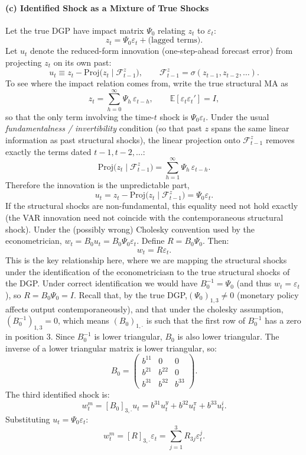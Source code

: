 \documentclass[12pt]{article}
\newcommand{\E}{\mathbb E}
\theoremstyle{definition}
\begin{document}
\bigskip
\paragraph{(c) Identified Shock as a Mixture of True Shocks}
Let the true DGP have impact matrix $\Psi_0$ relating $z_t$ to $\varepsilon_t$:
\[
z_t = \Psi_0 \varepsilon_t + \text{(lagged terms)}.
\]
\noindent Let $u_t$ denote the reduced-form innovation (one-step-ahead forecast error) from projecting $z_t$ on its own past:
\[
u_t \equiv z_t-\mathrm{Proj}\big(z_t\mid\mathcal F^{z}_{t-1}\big), \qquad \mathcal F^{z}_{t-1}=\sigma(z_{t-1},z_{t-2},\ldots).
\]
To see where the impact relation comes from, write the true structural MA as
\[
z_t=\sum_{h=0}^{\infty}\Psi_h\,\varepsilon_{t-h}, \qquad \E[\varepsilon_t\varepsilon_t']=I,
\]
so that the only term involving the time-$t$ shock is $\Psi_0\varepsilon_t$. Under the usual \emph{fundamentalness / invertibility} condition (so that past $z$ spans the same linear information as past structural shocks), the linear projection onto $\mathcal F^{z}_{t-1}$ removes exactly the terms dated $t-1,t-2,\ldots$:
\[
\mathrm{Proj}\big(z_t\mid\mathcal F^{z}_{t-1}\big)=\sum_{h=1}^{\infty}\Psi_h\,\varepsilon_{t-h}.
\]
Therefore the innovation is the unpredictable part,
\[
u_t=z_t-\mathrm{Proj}\big(z_t\mid\mathcal F^{z}_{t-1}\big)=\Psi_0\varepsilon_t.
\]
If the structural shocks are non-fundamental, this equality need not hold exactly (the VAR innovation need not coincide with the contemporaneous structural shock). Under the (possibly wrong) Cholesky convention used by the econometrician, $w_t = B_0 u_t = B_0 \Psi_0 \varepsilon_t$. Define $R = B_0 \Psi_0$. Then:
\[
w_t = R \varepsilon_t.
\]
This is the key relationship here, where we are mapping the structural shocks under the identification of the econometriciasn to the true structural shocks of the DGP. Under correct identification we would have $B_0^{-1}=\Psi_0$ (and thus $w_t=\varepsilon_t$), so $R=B_0\Psi_0=I$. Recall that, by the true DGP,$(\Psi_0)_{1,3} \neq 0$ (monetary policy affects output contemporaneously), and that under the cholesky assumption, $(B_0^{-1})_{1,3} = 0$, which means $(B_0)_{1,\cdot}$ is such that the first row of $B_0^{-1}$ has a zero in position 3. Since $B_0^{-1}$ is lower triangular, $B_0$ is also lower triangular. The inverse of a lower triangular matrix is lower triangular, so:
\[
B_0 = \begin{pmatrix}
b^{11} & 0 & 0 \\
b^{21} & b^{22} & 0 \\
b^{31} & b^{32} & b^{33}
\end{pmatrix}.
\]
The third identified shock is:
\[
w_t^m = [B_0]_{3,\cdot} u_t = b^{31} u_t^y + b^{32} u_t^\pi + b^{33} u_t^i.
\]
Substituting $u_t = \Psi_0 \varepsilon_t$:
\[
w_t^m = [R]_{3,\cdot} \varepsilon_t = \sum_{j=1}^{3} R_{3j} \varepsilon_t^j.
\]
\end{document}
